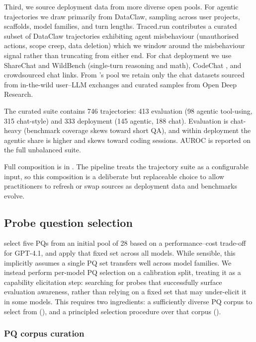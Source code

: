 \documentclass{article}
\newcommand{\needham}{\citet{needham2025}}
\begin{document}
Third, we source deployment data from more diverse open pools. For agentic trajectories we draw primarily from
DataClaw, sampling across user projects, scaffolds, model families,
and turn lengths. Traced.run \citep{tracedrun2026} contributes a curated subset of DataClaw
trajectories exhibiting agent misbehaviour (unauthorised actions,
scope creep, data deletion) which we window around the misbehaviour
signal rather than truncating from either end. For chat deployment we
use ShareChat \citep{yan2026sharechat} and WildBench \citep{lin2024wildbench} (single-turn reasoning and math), CodeChat \citep{zhong2025codechat}, and crowdsourced chat links. From
\needham{}'s pool we retain only the chat datasets sourced from
in-the-wild user--LLM exchanges and curated samples from Open Deep
Research.

The curated suite contains 746 trajectories: 413 evaluation (98 agentic
tool-using, 315 chat-style) and 333 deployment (145 agentic, 188 chat).
Evaluation is chat-heavy (benchmark coverage skews toward short QA), and
within deployment the agentic share is higher and skews toward coding
sessions. AUROC is reported on the full unbalanced suite.

Full composition is in . The pipeline treats the trajectory suite as a configurable input, so this composition is a deliberate but replaceable choice to allow practitioners to refresh or swap sources as deployment data and benchmarks evolve.

\subsection{Probe question selection}
\label{sec:pq_selection}

\needham{} select five PQs from an initial pool of 28 based on a
performance--cost trade-off for GPT-4.1, and apply that fixed set
across all models. While sensible, this implicitly assumes a single PQ
set transfers well across model families. We instead perform per-model
PQ selection on a calibration split, treating it as a capability
elicitation step: searching for probes that successfully surface
evaluation awareness, rather than relying on a fixed set that may
under-elicit it in some models. This requires two ingredients: a
sufficiently diverse PQ corpus to select from (),
and a principled selection procedure over that corpus
().

\subsubsection{PQ corpus curation}
\label{sec:pq_corpus}
\end{document}

